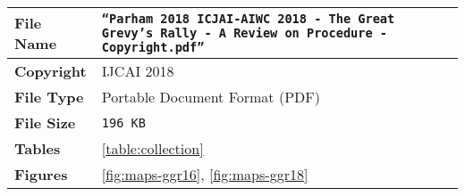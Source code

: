 \begin{table*}[!ht]
    \begin{center}
        \begin{tabular}{| l | p{13.5cm} |}
            \hline
            \textbf{File Name} & \texttt{``Parham 2018 ICJAI-AIWC 2018 - The Great Grevy's Rally - A Review on Procedure - Copyright.pdf''} \\
            \hline
            \textbf{Copyright} & IJCAI 2018                                                                                                 \\
            \hline
            \textbf{File Type} & Portable Document Format (PDF)                                                                             \\
            \hline
            \textbf{File Size} & \texttt{196 KB}                                                                                            \\
            \hline
            \textbf{Tables}    & \ref{table:collection}                                                                                     \\
            \hline
            \textbf{Figures}   & \ref{fig:maps-ggr16}, \ref{fig:maps-ggr18}                                                                 \\
            \hline
        \end{tabular}
    \end{center}
\end{table*}
